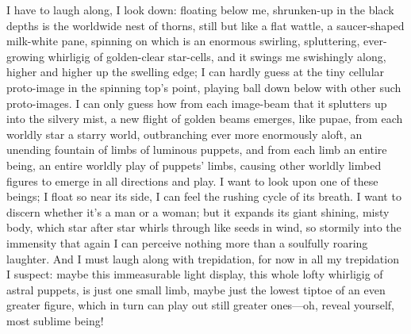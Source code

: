\documentclass[12pt,a4paper]{article}
\begin{document}
I have to laugh along, I look down: floating below me, shrunken-up in the black depths is the worldwide nest of thorns, still but like a flat wattle, a saucer-shaped milk-white pane, spinning on which is an enormous swirling, spluttering, ever-growing whirligig of golden-clear star-cells, and it swings me swishingly along, higher and higher up the swelling edge; I can hardly guess at the tiny cellular proto-image in the spinning top’s point, playing ball down below with other such proto-images. I can only guess how from each image-beam that it splutters up into the silvery mist, a new flight of golden beams emerges, like pupae, from each worldly star a starry world, outbranching ever more enormously aloft, an unending fountain of limbs of luminous puppets, and from each limb an entire being, an entire worldly play of puppets’ limbs, causing other worldly limbed figures to emerge in all directions and play. I want to look upon one of these beings; I float so near its side, I can feel the rushing cycle of its breath. I want to discern whether it’s a man or a woman; but it expands its giant shining, misty body, which star after star whirls through like seeds in wind, so stormily into the immensity that again I can perceive nothing more than a soulfully roaring laughter. And I must laugh along with trepidation, for now in all my trepidation I suspect: maybe this immeasurable light display, this whole lofty whirligig of astral puppets, is just one small limb, maybe just the lowest tiptoe of an even greater figure, which in turn can play out still greater ones—oh, reveal yourself, most sublime being!
\end{document}
